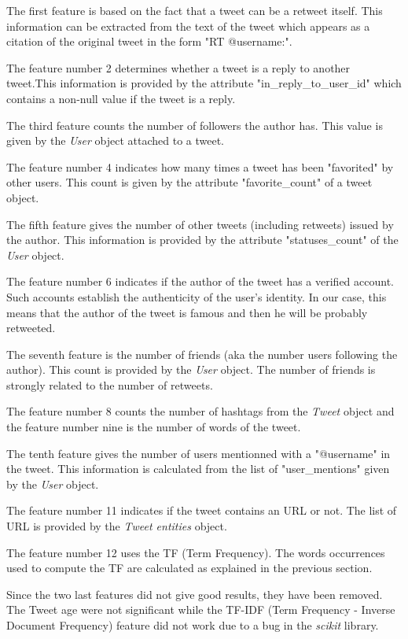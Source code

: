 The first feature is based on the fact that a tweet can be a retweet 
itself. This information can be extracted from the text of the tweet which 
appears as a citation of the original tweet in the form "RT @username:". 

The feature number 2 determines whether a tweet is a reply to another 
tweet.This information is provided by the attribute "in\_reply\_to\_user\_id" 
which contains a non-null value if the tweet is a reply.

The third feature counts the number of followers the author has. This value 
is given by the \emph{User} object attached to a tweet.

The feature number 4 indicates how many times a tweet has been "favorited" by 
other users. This count is given by the attribute "favorite\_count"  of a tweet 
object.

The fifth feature gives the number of other tweets (including retweets) issued 
by the author. This information is provided by the attribute "statuses\_count" 
of the \emph{User} object.

The feature number 6 indicates if the author of the tweet has a verified 
account. Such accounts establish the authenticity of the user's identity. In 
our case, this means that the author of the tweet is famous and then he will be 
probably retweeted.

The seventh feature is the number of friends (aka the number users following 
the author). This count is provided by the \emph{User} object. The number of 
friends is strongly related to the number of retweets.

The feature number 8 counts the number of hashtags from the \emph{Tweet} 
object and the feature number nine is the number of words of the tweet.

The tenth feature gives the number of users mentionned with a "@username" in 
the tweet. This information is calculated from the list of "user\_mentions" 
given by the \emph{User} object.

The feature number 11 indicates if the tweet contains an URL or not. The 
list of URL is provided by the \emph{Tweet entities} object.

The feature number 12 uses the TF (Term Frequency). The words occurrences 
used to compute the TF are calculated as explained in the previous section.

Since the two last features did not give good results, they have been 
removed. The Tweet age were not significant while the TF-IDF (Term Frequency - 
Inverse Document Frequency) feature did not work due to a bug in the 
\emph{scikit} library.